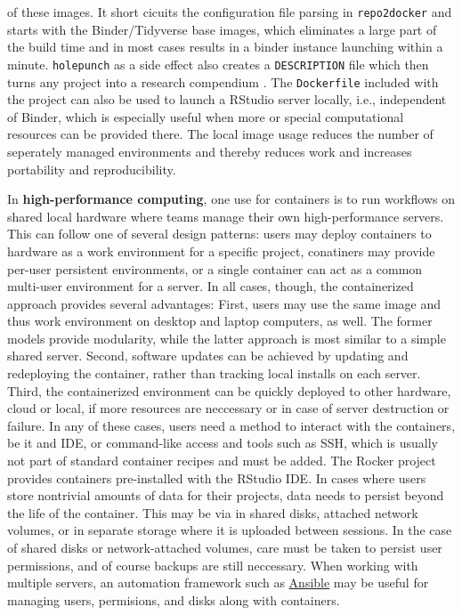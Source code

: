 of these images. It short cicuits the configuration file parsing in
\texttt{repo2docker} and starts with the Binder/Tidyverse base images,
which eliminates a large part of the build time and in most cases
results in a binder instance launching within a minute.
\texttt{holepunch} as a side effect also creates a \texttt{DESCRIPTION}
file which then turns any project into a research compendium
\citep{marwick_packaging_2018}. The \texttt{Dockerfile} included with
the project can also be used to launch a RStudio server locally, i.e.,
independent of Binder, which is especially useful when more or special
computational resources can be provided there. The local image usage
reduces the number of seperately managed environments and thereby
reduces work and increases portability and reproducibility.

In \textbf{high-performance computing}, one use for containers is to run
workflows on shared local hardware where teams manage their own
high-performance servers. This can follow one of several design
patterns: users may deploy containers to hardware as a work environment
for a specific project, conatiners may provide per-user persistent
environments, or a single container can act as a common multi-user
environment for a server. In all cases, though, the containerized
approach provides several advantages: First, users may use the same
image and thus work environment on desktop and laptop computers, as
well. The former models provide modularity, while the latter approach is
most similar to a simple shared server. Second, software updates can be
achieved by updating and redeploying the container, rather than tracking
local installs on each server. Third, the containerized environment can
be quickly deployed to other hardware, cloud or local, if more resources
are neccessary or in case of server destruction or failure. In any of
these cases, users need a method to interact with the containers, be it
and IDE, or command-like access and tools such as SSH, which is usually
not part of standard container recipes and must be added. The Rocker
project provides containers pre-installed with the RStudio IDE. In cases
where users store nontrivial amounts of data for their projects, data
needs to persist beyond the life of the container. This may be via in
shared disks, attached network volumes, or in separate storage where it
is uploaded between sessions. In the case of shared disks or
network-attached volumes, care must be taken to persist user
permissions, and of course backups are still neccessary. When working
with multiple servers, an automation framework such as
\href{https://www.ansible.com}{Ansible} may be useful for managing
users, permisions, and disks along with containers.

